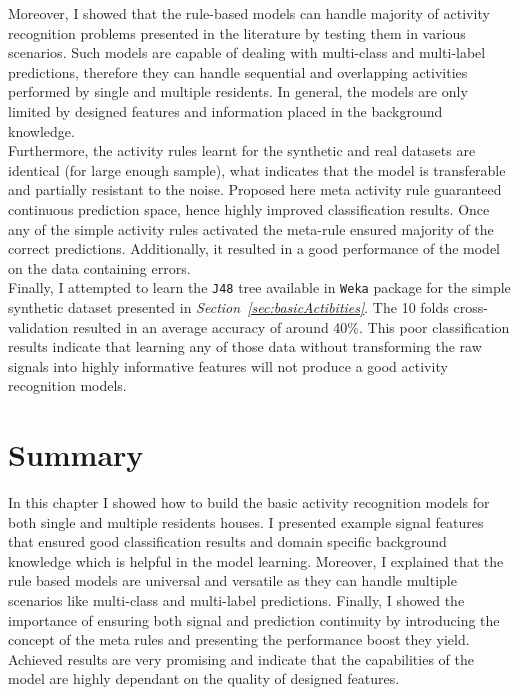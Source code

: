 \documentclass[10pt, a4paper, pdflatex, leqno, twoside, openright]{report}
\begin{document}
Moreover, I showed that the rule-based models can handle majority of activity recognition problems presented in the literature by testing them in various scenarios. Such models are capable of dealing with multi-class and multi-label predictions, therefore they can handle sequential and overlapping activities performed by single and multiple residents. In general, the models are only limited by designed features and information placed in the background knowledge.\\

Furthermore, the activity rules learnt for the synthetic and real datasets are identical (for large enough sample), what indicates that the model is transferable and partially resistant to the noise. Proposed here meta activity rule guaranteed continuous prediction space, hence highly improved classification results. Once any of the simple activity rules activated the meta-rule ensured majority of the correct predictions. Additionally, it resulted in a good performance of the model on the data containing errors.\\

Finally, I attempted to learn the \texttt{J48} tree available in \texttt{Weka} package for the simple synthetic dataset presented in \emph{Section~\ref{sec:basicActibities}}. The 10 folds cross-validation resulted in an average accuracy of around 40\%. This poor classification results indicate that learning any of those data without transforming the raw signals into highly informative features will not produce a good activity recognition models.

  \section{Summary}
In this chapter I showed how to build the basic activity recognition models for both single and multiple residents houses. I presented example signal features that ensured good classification results and domain specific background knowledge which is helpful in the model learning. Moreover, I explained that the rule based models are universal and versatile as they can handle multiple scenarios like multi-class and multi-label predictions. Finally, I showed the importance of ensuring both signal and prediction continuity by introducing the concept of the meta rules and presenting the performance boost they yield.\\

Achieved results are very promising and indicate that the capabilities of the model are highly dependant on the quality of designed features.
\end{document}
